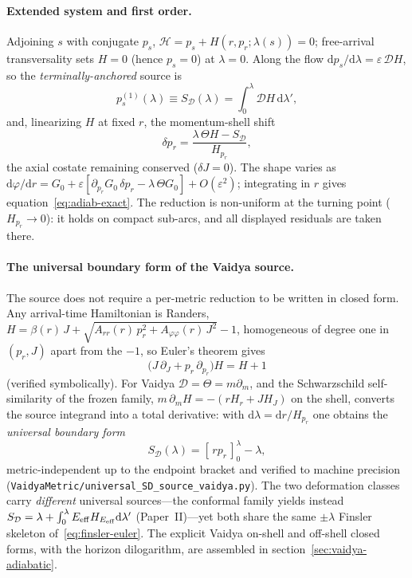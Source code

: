 \documentclass[12pt]{iopart}
\newcommand{\dd}{\mathrm{d}}
\begin{document}
\paragraph{Extended system and first order.} Adjoining $s$ with conjugate $p_s$,
$\mathcal H=p_s+H(r,p_r;\lambda(s))=0$; free-arrival transversality sets $H=0$ (hence
$p_s=0$) at $\lambda=0$. Along the flow $\dd p_s/\dd\lambda=\varepsilon\,\mathcal D H$, so
the \emph{terminally-anchored} source is
\begin{equation}
    p_s^{(1)}(\lambda)\equiv S_{\mathcal D}(\lambda)
    =\int_0^{\lambda}\mathcal D H\,\dd\lambda',
    \label{eq:pS-app}
\end{equation}
and, linearizing $H$ at fixed $r$, the momentum-shell shift
\begin{equation}
    \delta p_r=\frac{\lambda\,\Theta H-S_{\mathcal D}}{H_{p_r}},
    \label{eq:dpr-app}
\end{equation}
the axial costate remaining conserved ($\delta J=0$). The shape varies as
$\dd\varphi/\dd r=G_0+\varepsilon[\partial_{p_r}G_0\,\delta p_r-\lambda\,\Theta G_0]
+O(\varepsilon^2)$; integrating in $r$ gives equation~\eqref{eq:adiab-exact}. The reduction is
non-uniform at the turning point ($H_{p_r}\to0$): it holds on compact sub-arcs, and all
displayed residuals are taken there.

\paragraph{The universal boundary form of the Vaidya source.} The source does not
require a per-metric reduction to be written in closed form. Any arrival-time
Hamiltonian is Randers, $H=\beta(r)\,J+\sqrt{A_{rr}(r)\,p_r^2+A_{\varphi\varphi}(r)\,J^2}-1$,
homogeneous of degree one in $(p_r,J)$ apart from the $-1$, so Euler's theorem gives
\begin{equation}
    \big(J\,\partial_J+p_r\,\partial_{p_r}\big)H=H+1
    \label{eq:finsler-euler}
\end{equation}
(verified symbolically). For Vaidya $\mathcal D=\Theta=m\partial_m$, and the
Schwarzschild self-similarity of the frozen family,
$m\,\partial_m H=-(r H_r+J H_J)$ on the shell, converts the source integrand into a total
derivative: with $\dd\lambda=\dd r/H_{p_r}$ one obtains the \emph{universal boundary form}
\begin{equation}
    S_{\mathcal D}(\lambda)=[\,rp_r\,]_0^{\lambda}-\lambda,
    \label{eq:SD-vaidya}
\end{equation}
metric-independent up to the endpoint bracket and verified to machine precision
(\texttt{VaidyaMetric/universal\_SD\_source\_vaidya.py}). The two deformation classes
carry \emph{different} universal sources---the conformal family yields instead
$S_{\mathcal D}=\lambda+\int_0^\lambda E_{\rm eff}H_{E_{\rm eff}}\dd\lambda'$
(Paper~II)---yet both share the same $\pm\lambda$ Finsler skeleton
of~\eqref{eq:finsler-euler}. The explicit Vaidya on-shell and off-shell closed forms,
with the horizon dilogarithm, are assembled in section~\ref{sec:vaidya-adiabatic}.
\end{document}
